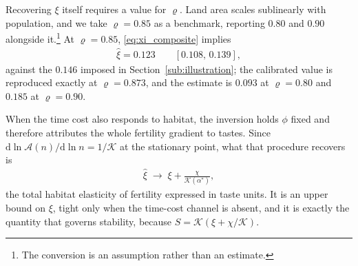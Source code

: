 \documentclass[11pt]{article}
\begin{document}
Recovering $\xi$ itself requires a value for $\varrho$. Land area scales sublinearly with population,
and we take $\varrho=0.85$ as a benchmark, reporting $0.80$ and $0.90$ alongside it.\footnote{The
conversion is an assumption rather than an estimate.} At $\varrho=0.85$, \eqref{eq:xi_composite}
implies
\begin{align}
\hat\xi=0.123\qquad[0.108,\,0.139],
\label{eq:xi_estimate}
\end{align}
against the $0.146$ imposed in Section~\ref{sub:illustration}; the calibrated value is reproduced
exactly at $\varrho=0.873$, and the estimate is $0.093$ at $\varrho=0.80$ and $0.185$ at
$\varrho=0.90$.

When the time cost also responds to habitat, the inversion holds $\phi$ fixed and therefore attributes the whole fertility
gradient to tastes. Since $\mathrm{d}\ln\mathcal{A}(n)/\mathrm{d}\ln n=1/\mathcal{K}$ at the
stationary point, what that procedure recovers is
\begin{align}
\hat\xi\;\longrightarrow\;\xi+\frac{\chi}{\mathcal{K}(\alpha^{\ast})},
\label{eq:xi_bound}
\end{align}
the total habitat elasticity of fertility expressed in taste units. It is an upper bound on $\xi$,
tight only when the time-cost channel is absent, and it is exactly the quantity that governs
stability, because $S=\mathcal{K}\left(\xi+\chi/\mathcal{K}\right)$.
\end{document}
